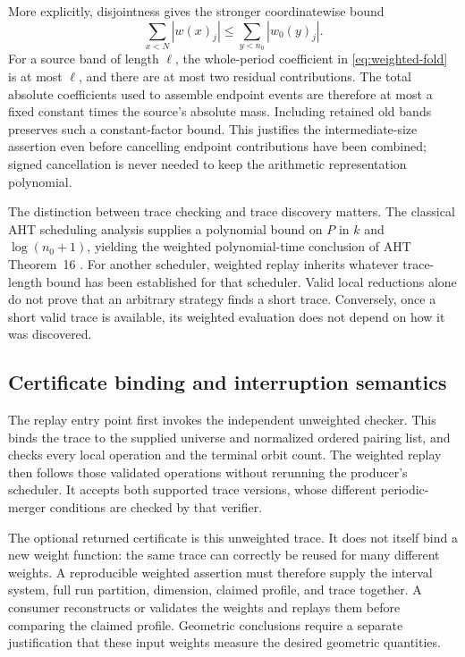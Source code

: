 More explicitly, disjointness gives the stronger coordinatewise bound
\[
 \sum_{x<N}|w(x)_j|
 \leq \sum_{y<n_0}|w_0(y)_j|.
\]
For a source band of length $\ell$, the whole-period coefficient in
\eqref{eq:weighted-fold} is at most $\ell$, and there are at most two residual
contributions.  The total absolute coefficients used to assemble endpoint
events are therefore at most a fixed constant times the source's absolute
mass.  Including retained old bands preserves such a constant-factor bound.
This justifies the intermediate-size assertion even before cancelling
endpoint contributions have been combined; signed cancellation is never
needed to keep the arithmetic representation polynomial.

The distinction between trace checking and trace discovery matters.  The
classical AHT scheduling analysis supplies a polynomial bound on $P$ in
$k$ and $\log(n_0+1)$, yielding the weighted polynomial-time conclusion of
AHT Theorem~16 \cite{AHT2006}.  For another scheduler, weighted replay inherits
whatever trace-length bound has been established for that scheduler.  Valid
local reductions alone do not prove that an arbitrary strategy finds a short
trace.  Conversely, once a short valid trace is available, its weighted
evaluation does not depend on how it was discovered.

\subsection{Certificate binding and interruption semantics}
\label{sec:weighted-certificates}

The replay entry point first invokes the independent unweighted checker.
This binds the trace to the supplied universe and normalized ordered pairing
list, and checks every local operation and the terminal orbit count.  The
weighted replay then follows those validated operations without rerunning
the producer's scheduler.  It accepts both supported trace versions, whose
different periodic-merger conditions are checked by that verifier.

The optional returned certificate is this unweighted trace.  It does not
itself bind a new weight function: the same trace can correctly be reused for
many different weights.  A reproducible weighted assertion must therefore
supply the interval system, full run partition, dimension, claimed profile,
and trace together.  A consumer reconstructs or validates the weights and
replays them before comparing the claimed profile.  Geometric conclusions
require a separate justification that these input weights measure the desired
geometric quantities.

